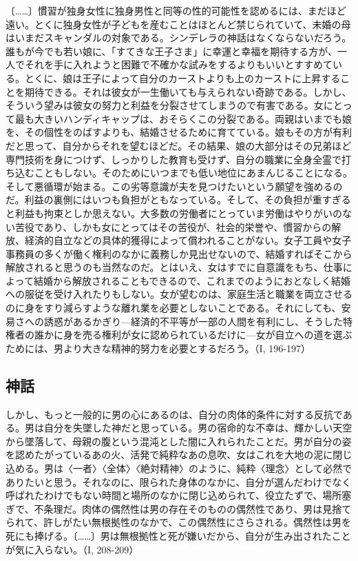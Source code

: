 〔……〕慣習が独身女性に独身男性と同等の性的可能性を認めるには、まだほど遠い。とくに独身女性が子どもを産むことはほとんど禁じられていて、未婚の母はいまだスキャンダルの対象である。シンデレラの神話はなくならないだろう。誰もが今でも若い娘に、「すてきな王子さま」に幸運と幸福を期待する方が、一人でそれを手に入れようと困難で不確かな試みをするよりもいいとすすめている。とくに、娘は王子によって自分のカーストよりも上のカーストに上昇することを期待できる。それは彼女が一生働いても与えられない奇跡である。しかし、そういう望みは彼女の努力と利益を分裂させてしまうので有害である。女にとって最も大きいハンディキャップは、おそらくこの分裂である。両親はいまでも娘を、その個性をのばすよりも、結婚させるために育てている。娘もその方が有利だと思って、自分からそれを望むほどだ。その結果、娘の大部分はその兄弟ほど専門技術を身につけず、しっかりした教育も受けず、自分の職業に全身全霊で打ち込むこともしない。そのためにいつまでも低い地位にあまんじることになる。そして悪循環が始まる。この劣等意識が夫を見つけたいという願望を強めるのだ。利益の裏側にはいつも負担がともなっている。そして、その負担が重すぎると利益も拘束としか思えない。大多数の労働者にとっていま労働はやりがいのない苦役であり、しかも女にとってはその苦役が、社会的栄誉や、慣習からの解放、経済的自立などの具体的獲得によって償われることがない。女子工員や女子事務員の多くが働く権利のなかに義務しか見出せないので、結婚すればそこから解放されると思うのも当然なのだ。とはいえ、女はすでに自意識をもち、仕事によって結婚から解放されることもできるので、これまでのようにおとなしく結婚への服従を受け入れたりもしない。女が望むのは、家庭生活と職業を両立させるのに身をすり減らすような離れ業を必要としないことである。それにしても、安易さへの誘惑があるかぎり{\——}経済的不平等が一部の人間を有利にし、そうした特権者の誰かに身を売る権利が女に認められているだけに{\——}女が自立への道を選ぶためには、男より大きな精神的努力を必要とするだろう。（I, 196-197）

\subsection{神話}


しかし、もっと一般的に男の心にあるのは、自分の肉体的条件に対する反抗である。男は自分を失墜した神だと思っている。男の宿命的な不幸は、輝かしい天空から墜落して、母親の腹という混沌とした闇に入れられたことだ。男が自分の姿を認めたがっているあの火、活発で純粋なあの息吹、女はこれを大地の泥に閉じ込める。男は〈一者〉〈全体〉〈絶対精神〉のように、純粋〈理念〉として必然でありたいと思う。それなのに、限られた身体のなかに、自分が選んだわけでなく呼ばれたわけでもない時間と場所のなかに閉じ込められて、役立たずで、場所塞ぎで、不条理だ。肉体の偶然性は男の存在そのものの偶然性であり、男は見捨てられて、許しがたい無根拠性のなかで、この偶然性にさらされる。偶然性は男を死にも捧げる。〔……〕男は無根拠性と死が嫌いだから、自分が生み出されたことが気に入らない。（I, 208-209）

